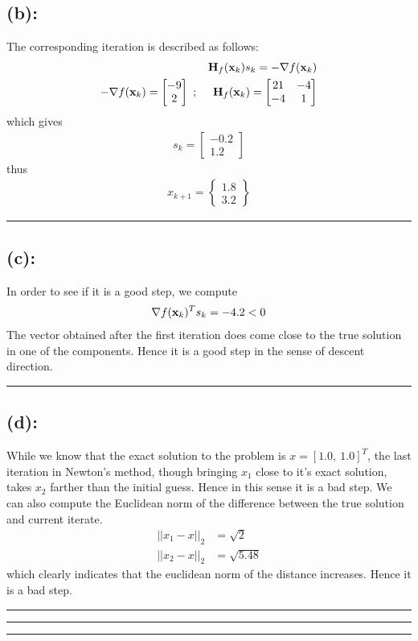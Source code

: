 \subsection*{(b): }
The corresponding iteration is described as follows: 
\begin{align*}
{\bf H}_f({\bf x}_k) s_k = -\nabla f({\bf x}_k) \\
-\nabla f({\bf x}_k) = 
\begin{bmatrix}
-9\\2
\end{bmatrix}\ ; \ \ \ \ {\bf H}_f({\bf x}_k) = 
\begin{bmatrix}
21 & -4 \\ -4 & 1
\end{bmatrix}
\end{align*}
which gives
\begin{align*}
s_k
=
\begin{bmatrix}
-0.2\\1.2
\end{bmatrix}
\end{align*}
thus 
\begin{align*}
x_{k+1}
=
\begin{Bmatrix}
1.8\\3.2
\end{Bmatrix}
\end{align*}\hrule
\subsection*{(c): }
In order to see if it is a good step, we compute 
\begin{align*}
\nabla f({\bf x}_k)^Ts_k
= -4.2 < 0
\end{align*}
The vector obtained after the first iteration does come close to the true solution in one of the components. Hence it is a good step in the sense of descent direction. \\ \hrule 
\subsection*{(d): }
While we know that the exact solution to the problem is $x = [1.0,\  1.0]^T$, the last iteration in Newton's method, though bringing $x_1$ close to it's exact solution, takes $x_2$ farther than the initial guess. Hence in this sense it is a bad step. We can also compute the Euclidean norm of the difference between the true solution and current iterate. 
\begin{align*}
||x_1 - x||_{2}
& =
\sqrt{2}\\
||x_2 - x||_{2}
& =
\sqrt{5.48}
\end{align*}
which clearly indicates that the euclidean norm of the distance increases. Hence it is a bad step. \\ \hrule \hrule \hrule 
